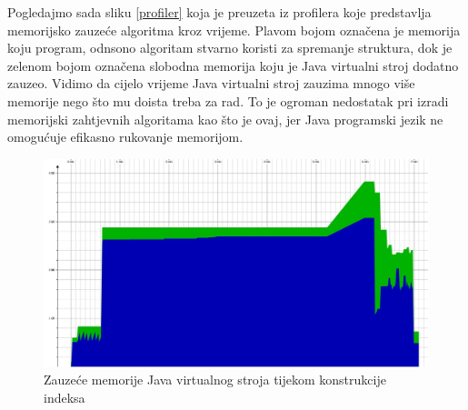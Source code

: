 Pogledajmo sada sliku \ref{profiler} koja je preuzeta iz profilera koje predstavlja memorijsko zauzeće algoritma kroz vrijeme. Plavom bojom označena je memorija koju program, odnsono algoritam stvarno koristi za spremanje struktura, dok je zelenom bojom označena slobodna memorija koju je Java virtualni stroj dodatno zauzeo. Vidimo da cijelo vrijeme Java virtualni stroj zauzima mnogo više memorije nego što mu doista treba za rad. To je ogroman nedostatak pri izradi memorijski zahtjevnih algoritama kao što je ovaj, jer Java programski jezik ne omogućuje efikasno rukovanje memorijom.

\begin{figure}[H]
   \centering
       \includegraphics[width=\linewidth]{./pictures/profiler.jpg}
 \caption{Zauzeće memorije Java virtualnog stroja tijekom konstrukcije indeksa}
 \label{fig:profiler}
\end{figure}